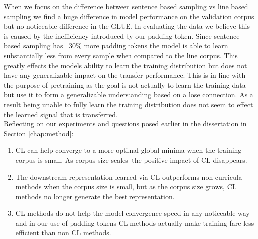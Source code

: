 When we focus on the difference between sentence based sampling vs line based sampling we find a huge difference in model performance on the validation corpus but no noticeable difference in the GLUE. In evaluating the data we believe this is caused by the inefficiency introduced by our padding token. Since sentence based sampling has ~30\% more padding tokens the model is able to learn substantially less from every sample when compared to the line corpus. This greatly effects the models ability to learn the training distribution but does not have any generalizable impact on the transfer performance. This is in line with the purpose of pretraining as the goal is not actually to learn the training data but use it to form a generalizable understanding based on a lose connection. As a result being unable to fully learn the training distribution does not seem to effect the learned signal that is transferred. \\
Reflecting on our experiments and questions posed earlier in the dissertation in Section \ref{chap:method}:
\begin{enumerate}
\item CL can help converge to a more optimal global minima when the training corpus is small. As corpus size scales, the positive impact of CL disappears.
\item The downstream representation learned via CL outperforms non-curricula methods when the corpus size is small, but as the corpus size grows, CL methods no longer generate the best representation.
\item CL methods do not help the model convergence speed in any noticeable way and in our use of padding tokens CL methods actually make training fare less efficient than non CL methods.
\end{enumerate}